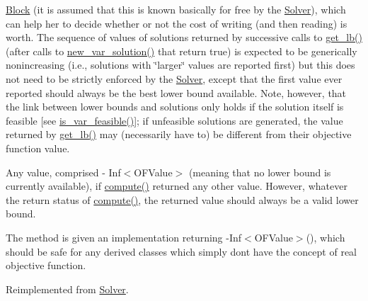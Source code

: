 \begin{DoxyItemize}
\mbox{\hyperlink{class_s_m_spp__di__unipi__it_1_1_block}{Block}} (it is assumed that this is known basically for free by the \mbox{\hyperlink{class_s_m_spp__di__unipi__it_1_1_solver}{Solver}}), which can help her to decide whether or not the cost of writing (and then reading) is worth. The sequence of values of solutions returned by successive calls to \mbox{\hyperlink{class_s_m_spp__di__unipi__it_1_1_m_c_f_solver_a064e49220c7f623cd53edbee8313c753}{get\+\_\+lb()}} (after calls to \mbox{\hyperlink{class_s_m_spp__di__unipi__it_1_1_m_c_f_solver_a62678dc9f7485d5a2992c588c5dc7d49}{new\+\_\+var\+\_\+solution()}} that return true) is expected to be generically nonincreasing (i.\+e., solutions with \char`\"{}larger\char`\"{} values are reported first) but this does not need to be strictly enforced by the \mbox{\hyperlink{class_s_m_spp__di__unipi__it_1_1_solver}{Solver}}, except that the first value ever reported should always be the best lower bound available. Note, however, that the link between lower bounds and solutions only holds if the solution itself is feasible \mbox{[}see \mbox{\hyperlink{class_s_m_spp__di__unipi__it_1_1_solver_a038fa1e554e91724e1ce3f593aba55fd}{is\+\_\+var\+\_\+feasible()}}\mbox{]}; if unfeasible solutions are generated, the value returned by \mbox{\hyperlink{class_s_m_spp__di__unipi__it_1_1_m_c_f_solver_a064e49220c7f623cd53edbee8313c753}{get\+\_\+lb()}} may (necessarily have to) be different from their objective function value.
\item Any value, comprised -\/ Inf$<$\+O\+F\+Value$>$ (meaning that no lower bound is currently available), if \mbox{\hyperlink{class_s_m_spp__di__unipi__it_1_1_m_c_f_solver_afc8ff54ab05d22f4cca0fb0bfbeb7a49}{compute()}} returned any other value. However, whatever the return status of \mbox{\hyperlink{class_s_m_spp__di__unipi__it_1_1_m_c_f_solver_afc8ff54ab05d22f4cca0fb0bfbeb7a49}{compute()}}, the returned value should always be a valid lower bound.
\end{DoxyItemize}

The method is given an implementation returning -\/\+Inf$<$\+O\+F\+Value$>$(), which should be safe for any derived classes which simply don\textquotesingle{}t have the concept of real objective function. 

Reimplemented from \mbox{\hyperlink{class_s_m_spp__di__unipi__it_1_1_solver_a4a4dbe4c2416d531c4619ca94fc07d31}{Solver}}.

\mbox{\label{class_s_m_spp__di__unipi__it_1_1_m_c_f_solver_a842fd454acaded84baf6b77e0d61a950}} 

